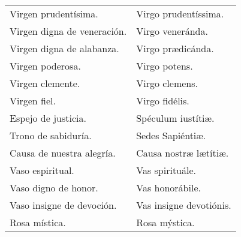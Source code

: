 \documentclass[./rosary.tex]{subfiles}
\begin{document}
\begin{longtable} { p{} p{} }
    Virgen pru­den­tísima.                                                                                                     & Virgo pru­den­tíssima.                         \\
    Virgen digna de veneración.                                                                                              & Virgo veneránda.                             \\
    Virgen digna de alabanza.                                                                                                & Virgo prædicánda.                            \\
    Virgen poderosa.                                                                                                         & Virgo potens.                                \\
    Virgen clemente.                                                                                                         & Virgo clemens.                               \\
    Virgen fiel.                                                                                                             & Virgo fidélis.                               \\
    Espejo de justicia.                                                                                                      & Spéculum iustítiæ.                           \\
    Trono de sabiduría.                                                                                                      & Sedes Sapiéntiæ.                             \\
    Causa de nuestra alegría.                                                                                                & Causa nostræ lætítiæ.                        \\
    Vaso espiritual.                                                                                                         & Vas spirituále.                              \\
    Vaso digno de honor.                                                                                                     & Vas honorábile.                              \\
    Vaso insigne de devoción.                                                                                                & Vas insigne devotiónis.                      \\
    Rosa mística.                                                                                                            & Rosa mýstica.                                \\

\end{longtable}
\end{document}
